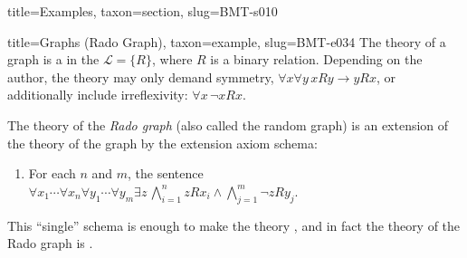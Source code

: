 \documentclass[a4paper]{article}
\begin{document}
\begin{tree}{title={Examples}, taxon={section}, slug={BMT-s010}}
\begin{tree}{title={Graphs (Rado Graph)}, taxon={example}, slug={BMT-e034}}
    The theory of a graph is a  in the  \(\mathcal  L= \{ R \}\), where \(R\) is a binary relation.
    Depending on the author, the theory may only demand symmetry, \(\forall  x \forall  y \, xRy \rightarrow  yRx\),
    or additionally include irreflexivity: \(\forall  x \, \neg  xRx\).
\par{
    The theory of the \emph{Rado graph} (also called the random graph) is an extension of the theory of the graph by the extension axiom schema:
    \begin{enumerate}
\item{
            For each \(n\) and \(m\), the sentence
            \(\forall  x_1 \cdots \forall  x_n \forall  y_1 \cdots \forall  y_m \exists  z \, \bigwedge _{i=1}^nzRx_i \land \bigwedge _{j=1}^m \neg  zRy_j\).
        }
\end{enumerate}
    This ``single'' schema is enough to make the theory ,
    and in fact the theory of the Rado graph is .
}
\end{tree}

\end{tree}


\printbibliography
\end{document}
